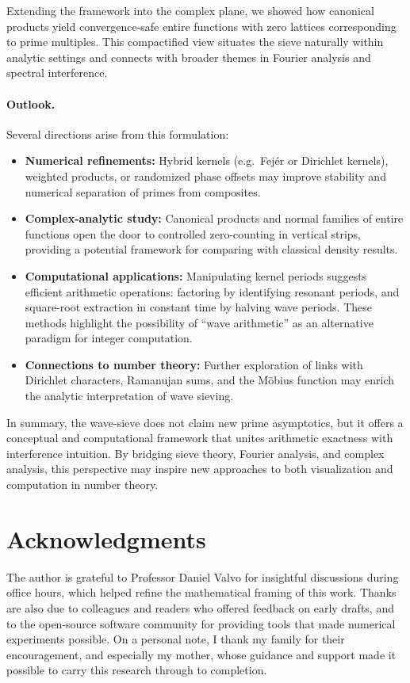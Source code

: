 \documentclass[12pt]{article}
\theoremstyle{definition}
\theoremstyle{remark}
\begin{document}
Extending the framework into the complex plane, we showed how canonical products yield convergence-safe entire functions with zero lattices corresponding to prime multiples. This compactified view situates the sieve naturally within analytic settings and connects with broader themes in Fourier analysis and spectral interference.

\paragraph{Outlook.} Several directions arise from this formulation:
\begin{itemize}
  \item \textbf{Numerical refinements:} Hybrid kernels (e.g.\ Fejér or Dirichlet kernels), weighted products, or randomized phase offsets may improve stability and numerical separation of primes from composites.  
  \item \textbf{Complex-analytic study:} Canonical products and normal families of entire functions open the door to controlled zero-counting in vertical strips, providing a potential framework for comparing with classical density results.  
  \item \textbf{Computational applications:} Manipulating kernel periods suggests efficient arithmetic operations: factoring by identifying resonant periods, and square-root extraction in constant time by halving wave periods. These methods highlight the possibility of ``wave arithmetic'' as an alternative paradigm for integer computation.  
  \item \textbf{Connections to number theory:} Further exploration of links with Dirichlet characters, Ramanujan sums, and the Möbius function may enrich the analytic interpretation of wave sieving.  
\end{itemize}

In summary, the wave-sieve does not claim new prime asymptotics, but it offers a conceptual and computational framework that unites arithmetic exactness with interference intuition. By bridging sieve theory, Fourier analysis, and complex analysis, this perspective may inspire new approaches to both visualization and computation in number theory.

\section*{Acknowledgments}

The author is grateful to Professor Daniel Valvo for insightful discussions during office hours, which helped refine the mathematical framing of this work. Thanks are also due to colleagues and readers who offered feedback on early drafts, and to the open-source software community for providing tools that made numerical experiments possible. On a personal note, I thank my family for their encouragement, and especially my mother, whose guidance and support made it possible to carry this research through to completion.
\end{document}
